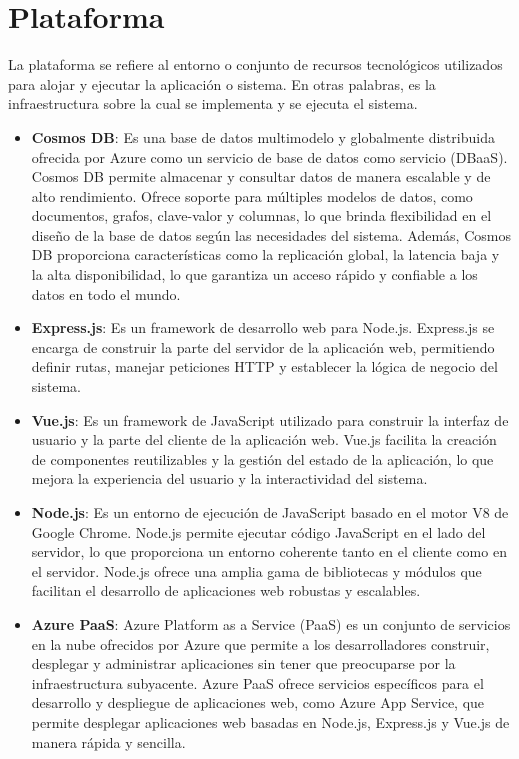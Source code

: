 \section{Plataforma}

La plataforma se refiere al entorno o conjunto de recursos tecnológicos utilizados para alojar y ejecutar la aplicación o sistema. En otras palabras, es la infraestructura sobre la cual se implementa y se ejecuta el sistema.

\begin{itemize}
\item \textbf{Cosmos DB}: Es una base de datos multimodelo y globalmente distribuida ofrecida por Azure como un servicio de base de datos como servicio (DBaaS). Cosmos DB permite almacenar y consultar datos de manera escalable y de alto rendimiento. Ofrece soporte para múltiples modelos de datos, como documentos, grafos, clave-valor y columnas, lo que brinda flexibilidad en el diseño de la base de datos según las necesidades del sistema. Además, Cosmos DB proporciona características como la replicación global, la latencia baja y la alta disponibilidad, lo que garantiza un acceso rápido y confiable a los datos en todo el mundo.

\item \textbf{Express.js}: Es un framework de desarrollo web para Node.js. Express.js se encarga de construir la parte del servidor de la aplicación web, permitiendo definir rutas, manejar peticiones HTTP y establecer la lógica de negocio del sistema.

\item \textbf{Vue.js}: Es un framework de JavaScript utilizado para construir la interfaz de usuario y la parte del cliente de la aplicación web. Vue.js facilita la creación de componentes reutilizables y la gestión del estado de la aplicación, lo que mejora la experiencia del usuario y la interactividad del sistema.

\item \textbf{Node.js}: Es un entorno de ejecución de JavaScript basado en el motor V8 de Google Chrome. Node.js permite ejecutar código JavaScript en el lado del servidor, lo que proporciona un entorno coherente tanto en el cliente como en el servidor. Node.js ofrece una amplia gama de bibliotecas y módulos que facilitan el desarrollo de aplicaciones web robustas y escalables.

\item \textbf{Azure PaaS}: Azure Platform as a Service (PaaS) es un conjunto de servicios en la nube ofrecidos por Azure que permite a los desarrolladores construir, desplegar y administrar aplicaciones sin tener que preocuparse por la infraestructura subyacente. Azure PaaS ofrece servicios específicos para el desarrollo y despliegue de aplicaciones web, como Azure App Service, que permite desplegar aplicaciones web basadas en Node.js, Express.js y Vue.js de manera rápida y sencilla.


\end{itemize}
